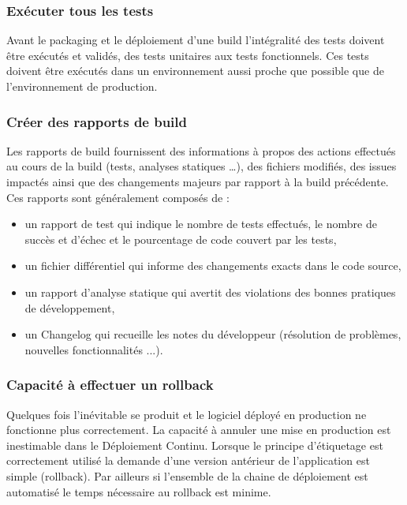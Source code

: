 \documentclass{report}
\begin{document}
        \subsubsection{Exécuter tous les tests}
        Avant le packaging et le déploiement d’une build l’intégralité des tests doivent être exécutés et validés, des tests unitaires aux tests fonctionnels. Ces tests doivent être exécutés dans un environnement aussi proche que possible que de l’environnement de production.

        \subsubsection{Créer des rapports de build}
        Les rapports de build fournissent des informations à propos des actions effectués au cours de la build (tests, analyses statiques …), des fichiers modifiés, des issues impactés ainsi que des changements majeurs par rapport à la build précédente. Ces rapports sont généralement composés de :\\
        \begin{itemize}
          \item un rapport de test qui indique le nombre de tests effectués, le nombre de succès et d’échec et le pourcentage de code couvert par les tests,
          \item un fichier différentiel qui informe des changements exacts dans le code source,
          \item un rapport d’analyse statique qui avertit des violations des bonnes pratiques de développement,
          \item un Changelog qui recueille les notes du développeur (résolution de problèmes, nouvelles fonctionnalités ...).\\
        \end{itemize}

        \subsubsection{Capacité à effectuer un rollback}
        Quelques fois l’inévitable se produit et le logiciel déployé en production ne fonctionne plus correctement. La capacité à annuler une mise en production est inestimable dans le Déploiement Continu. Lorsque le principe d’étiquetage est correctement utilisé la demande d’une version antérieur de l’application est simple (rollback). Par ailleurs si l’ensemble de la chaine de déploiement est automatisé le temps nécessaire au rollback est minime.
\end{document}
